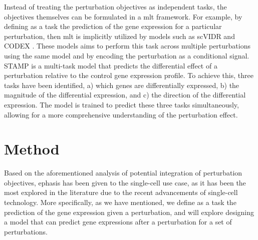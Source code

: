 \documentclass[12pt, a4paper]{article}
\begin{document}
Instead of treating the perturbation objectives as independent tasks, the objectives themselves can be formulated in a \gls{mlt} framework. For example, by defining as a task the prediction of the gene expression for a particular perturbation, then \gls{mlt} is implicitly utilized by models such as scVIDR \cite{kanaGenerativeModelingSinglecell2023} and CODEX \cite{schrod2024codex}. These models aims to perform this task across multiple perturbations using the same model and by encoding the perturbation as a conditional signal. STAMP \cite{gaoSubtaskDecompositionbasedLearning2024} is a multi-task model that predicts the differential effect of a perturbation relative to the control gene expression profile. To achieve this, three tasks have been identified, a) which genes are differentially expressed, b) the magnitude of the differential expression, and c) the direction of the differential expression. The model is trained to predict these three tasks simultaneously, allowing for a more comprehensive understanding of the perturbation effect.






\section{Method}

Based on the aforementioned analysis of potential integration of perturbation objectives, ephasis has been given to the single-cell 
use case, as it has been the most explored in the literature due to the recent advancements of single-cell technology. More specifically, as we have mentioned, we define as a task the prediction of the gene expression given a perturbation, and will explore designing a model that can predict gene expressions after a perturbation for a set of perturbations. 

\end{document}
